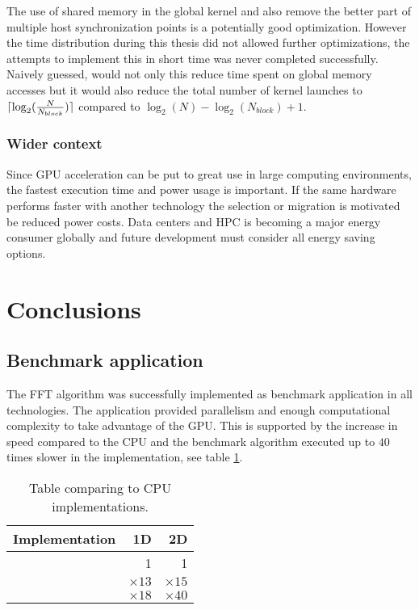The use of shared memory in the global \gls{kernel} and also remove the better part of multiple host synchronization points is a potentially good optimization. However the time distribution during this thesis did not allowed further optimizations, the attempts to implement this in short time was never completed successfully. Naively guessed, would not only this reduce time spent on global memory accesses but it would also reduce the total number of kernel launches to $\lceil\log_{2}(\frac{N}{N_{block}})\rceil$ compared to $\log_{2}(N) - \log_{2}(N_{block}) + 1$.

\subsubsection{Wider context}

Since \gls{GPU} acceleration can be put to great use in large computing environments, the fastest execution time and power usage is important. If the same hardware performs faster with another technology the selection or migration is motivated be reduced power costs. Data centers and \gls{HPC} is becoming a major energy consumer globally and future development must consider all energy saving options.

\section{Conclusions}

\subsection{Benchmark application}

The \gls{FFT} algorithm was successfully implemented as benchmark application in all technologies. The application provided parallelism and enough computational complexity to take advantage of the \gls{GPU}. This is supported by the increase in speed compared to the \gls{CPU} and the benchmark algorithm executed up to $40$ times slower in the {\CPP} implementation, see table \ref{tab:cu-vs-cpu}.

\begin{table}
	\centering	
	\begin{tabular}{|l|r|r|}
		\hline
		Implementation & 1D & 2D \\ \hline
		{\CU} & 1 & 1 \\ \hline
		{\OMP} & ${\times}13$ & ${\times}15$ \\ \hline
		{\CPP} & ${\times}18$ & ${\times}40$ \\ \hline
	\end{tabular}
	\caption{Table comparing {\CU} to \gls{CPU} implementations.}
	\label{tab:cu-vs-cpu}
\end{table}

